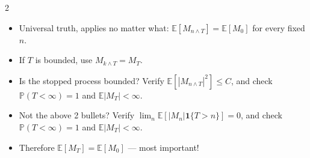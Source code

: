 \documentclass[8pt,letterpaper]{extarticle}
\begin{document}
\begin{multicols}{2}
\begin{itemize}
\begin{itemize}
      \item Universal truth, applies no matter what: $\mathbb{E}[M_{n\wedge T}]=\mathbb{E}[M_0]$ for every fixed $n$.
      \item If $T$ is bounded, use $M_{k\wedge T}=M_T$.
      \item Is the stopped process bounded? Verify $\mathbb{E}[|M_{n\wedge T}|^2]\le C$, and check $\mathbb{P}(T<\infty)=1$ and $\mathbb{E}|M_T|<\infty$.
      \item Not the above 2 bullets? Verify $\lim_n \mathbb{E}[|M_n|\mathbf{1}\{T>n\}]=0$, and check $\mathbb{P}(T<\infty)=1$ and $\mathbb{E}|M_T|<\infty$.
      \item Therefore $\mathbb{E}[M_T]=\mathbb{E}[M_0]$ --- most important!
    \end{itemize}
\end{itemize}


\end{multicols}
\end{document}
